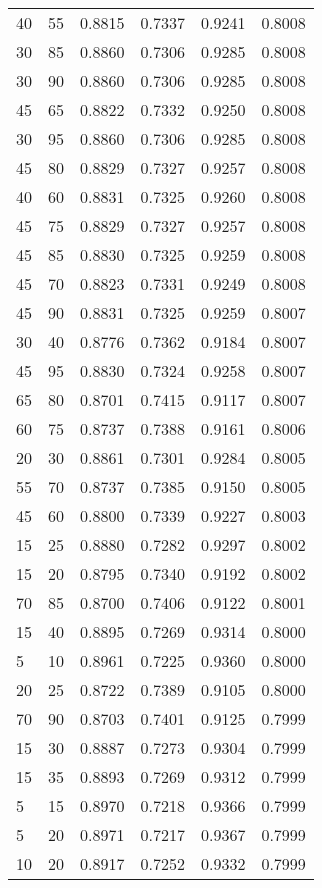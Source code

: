 \begin{center}
\begin{longtable}{|l|l|l|l|l|l|}
40 & 55 & 0.8815 & 0.7337 & 0.9241 & 0.8008 \\
30 & 85 & 0.8860 & 0.7306 & 0.9285 & 0.8008 \\
30 & 90 & 0.8860 & 0.7306 & 0.9285 & 0.8008 \\
45 & 65 & 0.8822 & 0.7332 & 0.9250 & 0.8008 \\
30 & 95 & 0.8860 & 0.7306 & 0.9285 & 0.8008 \\
45 & 80 & 0.8829 & 0.7327 & 0.9257 & 0.8008 \\
40 & 60 & 0.8831 & 0.7325 & 0.9260 & 0.8008 \\
45 & 75 & 0.8829 & 0.7327 & 0.9257 & 0.8008 \\
45 & 85 & 0.8830 & 0.7325 & 0.9259 & 0.8008 \\
45 & 70 & 0.8823 & 0.7331 & 0.9249 & 0.8008 \\
45 & 90 & 0.8831 & 0.7325 & 0.9259 & 0.8007 \\
30 & 40 & 0.8776 & 0.7362 & 0.9184 & 0.8007 \\
45 & 95 & 0.8830 & 0.7324 & 0.9258 & 0.8007 \\
65 & 80 & 0.8701 & 0.7415 & 0.9117 & 0.8007 \\
60 & 75 & 0.8737 & 0.7388 & 0.9161 & 0.8006 \\
20 & 30 & 0.8861 & 0.7301 & 0.9284 & 0.8005 \\
55 & 70 & 0.8737 & 0.7385 & 0.9150 & 0.8005 \\
45 & 60 & 0.8800 & 0.7339 & 0.9227 & 0.8003 \\
15 & 25 & 0.8880 & 0.7282 & 0.9297 & 0.8002 \\
15 & 20 & 0.8795 & 0.7340 & 0.9192 & 0.8002 \\
70 & 85 & 0.8700 & 0.7406 & 0.9122 & 0.8001 \\
15 & 40 & 0.8895 & 0.7269 & 0.9314 & 0.8000 \\
5  & 10 & 0.8961 & 0.7225 & 0.9360 & 0.8000 \\
20 & 25 & 0.8722 & 0.7389 & 0.9105 & 0.8000 \\
70 & 90 & 0.8703 & 0.7401 & 0.9125 & 0.7999 \\
15 & 30 & 0.8887 & 0.7273 & 0.9304 & 0.7999 \\
15 & 35 & 0.8893 & 0.7269 & 0.9312 & 0.7999 \\
5  & 15 & 0.8970 & 0.7218 & 0.9366 & 0.7999 \\
5  & 20 & 0.8971 & 0.7217 & 0.9367 & 0.7999 \\
10 & 20 & 0.8917 & 0.7252 & 0.9332 & 0.7999 \\

\end{longtable}
\end{center}
